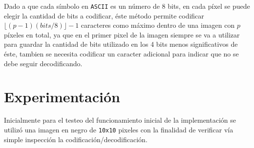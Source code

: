 \documentclass[conference]{IEEEtran}
\begin{document}
        Dado a que cada símbolo en \texttt{ASCII} es un número de 8 bits, en cada píxel se puede elegir la cantidad de bits a codificar, éste método permite codificar $\lfloor(p-1)(bits / 8)\rfloor - 1$ caracteres como máximo dentro de una imagen con $p$ píxeles en total, ya que en el primer pixel de la imagen siempre se va a utilizar para guardar la cantidad de bits utilizado en los 4 bits menos significativos de éste, tambien se necesita codificar un caracter adicional para indicar que no se debe seguir decodificando.
        
        
\section*{Experimentación}
    Inicialmente para el testeo del funcionamiento inicial de la implementación se utilizó una imagen en negro de \texttt{10x10} pixeles con la finalidad de verificar vía simple inspección la codificación/decodificación. \\
    
\end{document}
